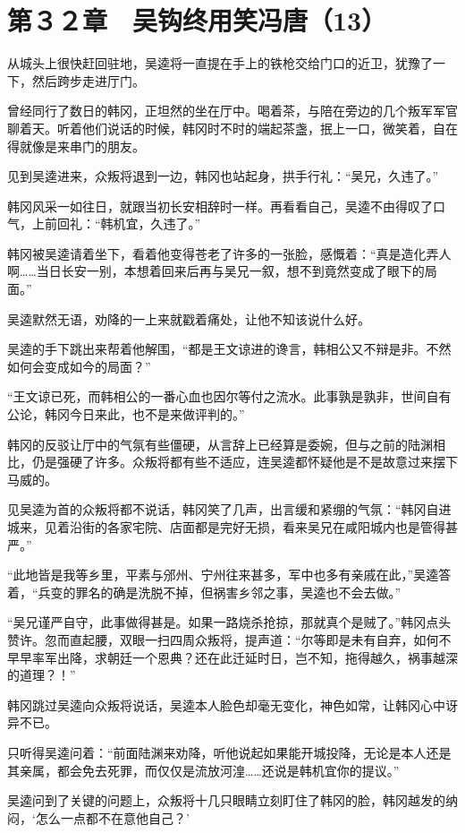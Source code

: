 \section{第３２章　吴钩终用笑冯唐（13）}

从城头上很快赶回驻地，吴逵将一直提在手上的铁枪交给门口的近卫，犹豫了一下，然后跨步走进厅门。

曾经同行了数日的韩冈，正坦然的坐在厅中。喝着茶，与陪在旁边的几个叛军军官聊着天。听着他们说话的时候，韩冈时不时的端起茶盏，抿上一口，微笑着，自在得就像是来串门的朋友。

见到吴逵进来，众叛将退到一边，韩冈也站起身，拱手行礼：“吴兄，久违了。”

韩冈风采一如往日，就跟当初长安相辞时一样。再看看自己，吴逵不由得叹了口气，上前回礼：“韩机宜，久违了。”

韩冈被吴逵请着坐下，看着他变得苍老了许多的一张脸，感慨着：“真是造化弄人啊……当日长安一别，本想着回来后再与吴兄一叙，想不到竟然变成了眼下的局面。”

吴逵默然无语，劝降的一上来就戳着痛处，让他不知该说什么好。

吴逵的手下跳出来帮着他解围，“都是王文谅进的谗言，韩相公又不辩是非。不然如何会变成如今的局面？”

“王文谅已死，而韩相公的一番心血也因尔等付之流水。此事孰是孰非，世间自有公论，韩冈今日来此，也不是来做评判的。”

韩冈的反驳让厅中的气氛有些僵硬，从言辞上已经算是委婉，但与之前的陆渊相比，仍是强硬了许多。众叛将都有些不适应，连吴逵都怀疑他是不是故意过来摆下马威的。

见吴逵为首的众叛将都不说话，韩冈笑了几声，出言缓和紧绷的气氛：“韩冈自进城来，见着沿街的各家宅院、店面都是完好无损，看来吴兄在咸阳城内也是管得甚严。”

“此地皆是我等乡里，平素与邠州、宁州往来甚多，军中也多有亲戚在此，”吴逵答着，“兵变的罪名的确是洗脱不掉，但祸害乡邻之事，吴逵也不会去做。”

“吴兄谨严自守，此事做得甚是。如果一路烧杀抢掠，那就真个是贼了。”韩冈点头赞许。忽而直起腰，双眼一扫四周众叛将，提声道：“尔等即是未有自弃，如何不早早率军出降，求朝廷一个恩典？还在此迁延时日，岂不知，拖得越久，祸事越深的道理？！”

韩冈跳过吴逵向众叛将说话，吴逵本人脸色却毫无变化，神色如常，让韩冈心中讶异不已。

只听得吴逵问着：“前面陆渊来劝降，听他说起如果能开城投降，无论是本人还是其亲属，都会免去死罪，而仅仅是流放河湟……还说是韩机宜你的提议。”

吴逵问到了关键的问题上，众叛将十几只眼睛立刻盯住了韩冈的脸，韩冈越发的纳闷，‘怎么一点都不在意他自己？’


